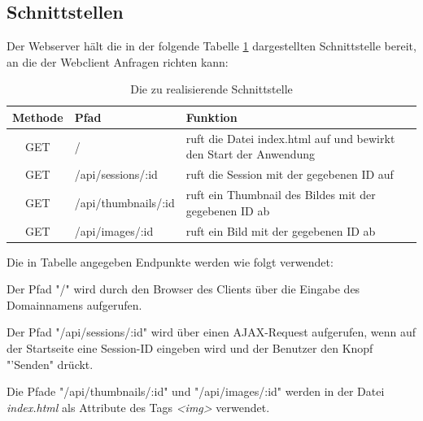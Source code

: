\subsection{Schnittstellen}
\label{webserver_schnittstellen}
Der Webserver hält die in der folgende Tabelle \ref{tab_api_routes} dargestellten Schnittstelle bereit, an die der Webclient 
Anfragen richten kann:
\begin{table}[h]
	\begin{center}
		\begin{tabularx}{\textwidth}{|c|l|X|}
			\hline
			\textbf{Methode} & \textbf{Pfad} & \textbf{Funktion}\\
			\hline
			GET & / & ruft die Datei index.html auf und bewirkt den Start der Anwendung \\
			\hline
			GET & /api/sessions/:id & ruft die Session mit der gegebenen ID auf \\
			\hline
			GET & /api/thumbnails/:id & ruft ein Thumbnail des Bildes mit der gegebenen ID ab \\
			\hline
			GET & /api/images/:id & ruft ein Bild mit der gegebenen ID ab \\
			\hline
		\end{tabularx}
		\caption{Die zu realisierende Schnittstelle}
		\label{tab_api_routes}
	\end{center}
\end{table}

Die in Tabelle angegeben Endpunkte werden wie folgt verwendet:

Der Pfad "/"{} wird durch den Browser des Clients über die Eingabe des Domainnamens aufgerufen.

Der Pfad "/api/sessions/:id"{} wird über einen AJAX-Request aufgerufen, wenn auf der Startseite eine Session-ID 
eingeben wird und der Benutzer den Knopf  "'Senden" drückt.

Die Pfade "/api/thumbnails/:id"{} und "/api/images/:id"{} werden in der Datei \textit{index.html} als Attribute des Tags \textit{\textless img\textgreater} verwendet.

